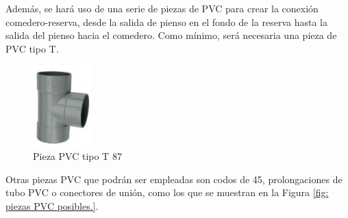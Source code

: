 \documentclass[12pt]{article}
\begin{document}
	\noindent Además, se hará uso de una serie de piezas de PVC para crear la conexión comedero-reserva, desde la salida de pienso en el fondo de la reserva hasta la salida del pienso hacia el comedero. Como mínimo, será necesaria una pieza de PVC tipo T.\\
	
	
	\begin{figure}[h!]
		\begin{center}
			\includegraphics[width=0.2\textwidth]{img/pieza_pvc_T.png}
			\caption{Pieza PVC tipo T 87\degree [\ref{bib: Nikoi ferreteria}]}
			\label{Pieza PVC T}
		\end{center}
	\end{figure}
	
	\noindent Otras piezas PVC que podrán ser empleadas son codos de 45\degree, prolongaciones de tubo PVC o conectores de unión, como los que se muestran en la Figura \ref{fig: piezas PVC posibles.}.\\
	
\end{document}
